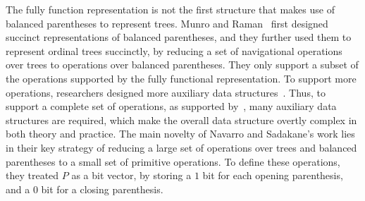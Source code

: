 The fully function representation is not the first structure that makes use of balanced parentheses to represent trees. 
Munro and Raman~\cite{mr1997} first designed succinct representations of balanced parentheses, and they further used them to represent ordinal trees succinctly, by reducing a set of navigational operations over trees to operations over balanced parentheses. 
They only support a subset of the operations supported by the fully functional representation.
To support more operations, researchers designed more auxiliary data structures~\cite{ly2008}. 
Thus, to support a complete set of operations, as supported by~\cite{Navarro:2014:FFS:2620785.2601073},  many auxiliary data structures are required, which make the overall data structure overtly complex in both theory and practice. 
The main novelty of Navarro and Sadakane's work lies in their key strategy of reducing a large set of operations over trees and balanced parentheses to a small set of primitive operations. 
To define these operations, they treated $P$ as a bit vector, by storing a $1$ bit for each opening parenthesis, and a $0$ bit for a closing parenthesis. 
%
%
